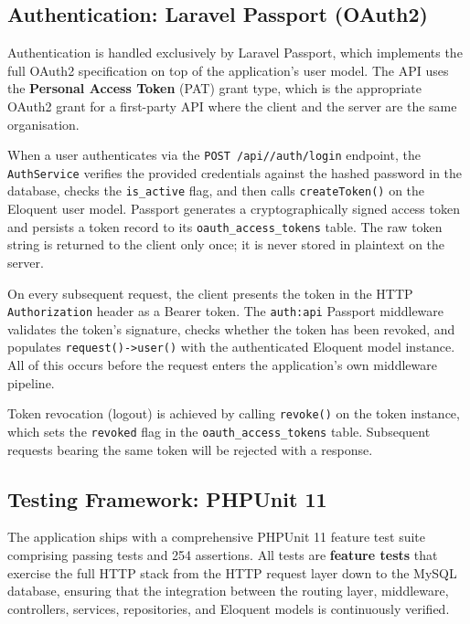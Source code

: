 \subsection{Authentication: Laravel Passport (OAuth2)}

Authentication is handled exclusively by Laravel Passport, which
implements the full OAuth2 specification on top of the application's
user model. The API uses the \textbf{Personal Access Token} (PAT) grant
type, which is the appropriate OAuth2 grant for a first-party API where
the client and the server are the same organisation.

When a user authenticates via the \texttt{POST /api/\apiversion{}/auth/login}
endpoint, the \texttt{AuthService} verifies the provided credentials
against the hashed password in the database, checks the
\texttt{is\_active} flag, and then calls \texttt{createToken()} on the
Eloquent user model. Passport generates a cryptographically signed
access token and persists a token record to its \texttt{oauth\_access\_tokens}
table. The raw token string is returned to the client only once; it is
never stored in plaintext on the server.

On every subsequent request, the client presents the token in the HTTP
\texttt{Authorization} header as a Bearer token. The \texttt{auth:api}
Passport middleware validates the token's signature, checks whether the
token has been revoked, and populates \texttt{request()->user()} with
the authenticated Eloquent model instance. All of this occurs before the
request enters the application's own middleware pipeline.

Token revocation (logout) is achieved by calling \texttt{revoke()} on
the token instance, which sets the \texttt{revoked} flag in the
\texttt{oauth\_access\_tokens} table. Subsequent requests bearing the
same token will be rejected with a \stunauth{} response.

\subsection{Testing Framework: PHPUnit 11}

The application ships with a comprehensive PHPUnit 11 feature test suite
comprising \testcount{} passing tests and 254 assertions. All tests are
\textbf{feature tests} that exercise the full HTTP stack from the HTTP
request layer down to the MySQL database, ensuring that the integration
between the routing layer, middleware, controllers, services, repositories,
and Eloquent models is continuously verified.

